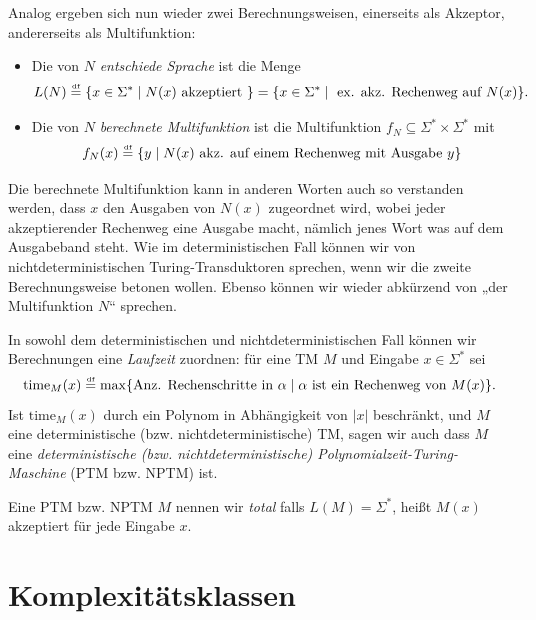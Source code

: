 Analog ergeben sich nun wieder zwei Berechnungsweisen, einerseits als Akzeptor, andererseits als Multifunktion:
\begin{itemize}
    \item Die von $N$ \emph{entschiede  Sprache} ist die Menge \[ L(N)\stackrel{\text{\smash{\tiny df}}}{=}\{ x\in\Sigma^* \mid N(x) \text{ akzeptiert } \} = \{ x\in\Sigma^* \mid \text{ ex. akz. Rechenweg auf $N(x)$} \}. \]
    \item Die von $N$ \emph{berechnete Multifunktion} ist die Multifunktion $f_N\subseteq\Sigma^*\times\Sigma^*$ mit
        \[ f_N(x) \stackrel{\text{\smash{\tiny df}}}{=} \{ y \mid \text{$N(x)$ akz. auf einem Rechenweg mit Ausgabe $y$} \}  \] 
\end{itemize}
Die berechnete Multifunktion kann in anderen Worten auch so verstanden werden, dass $x$ den Ausgaben von $N(x)$ zugeordnet wird, wobei jeder akzeptierender Rechenweg eine Ausgabe macht, nämlich jenes Wort was auf dem Ausgabeband steht.
Wie im deterministischen Fall können wir von nichtdeterministischen Turing-Transduktoren sprechen, wenn wir die zweite Berechnungsweise betonen wollen. Ebenso können wir wieder abkürzend von „der Multifunktion $N$“ sprechen.

In sowohl dem deterministischen und nichtdeterministischen Fall können wir Berechnungen eine \emph{Laufzeit} zuordnen: für eine TM $M$ und Eingabe $x\in\Sigma^*$ sei
\[ \mathrm{time}_M(x) \stackrel{\text{\smash{\tiny df}}}{=} \max \{ \text{Anz. Rechenschritte in $\alpha$} \mid \text{$\alpha$ ist ein Rechenweg von $M(x)$}  \}. \]
Ist $\mathrm{time}_M(x)$ durch ein Polynom in Abhängigkeit von $|x|$ beschränkt, und $M$ eine deterministische (bzw. nichtdeterministische) TM, sagen wir auch dass $M$ eine \emph{deterministische (bzw. nichtdeterministische) Polynomialzeit-Turing-Maschine} (PTM bzw. NPTM) ist. 

Eine PTM bzw. NPTM $M$ nennen wir \emph{total} falls $L(M)=\Sigma^*$, heißt $M(x)$ akzeptiert für jede Eingabe $x$.


\section{Komplexitätsklassen}\label{sec:prelim-klassen}

